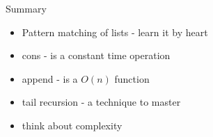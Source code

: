 \begin{frame}{Summary}

\begin{itemize}
 \pause\item Pattern matching of lists - learn it by heart
 \pause\item cons - is a constant time operation
 \pause\item append - is a $O(n)$ function
 \pause\item tail recursion - a technique to master 
 \pause\item think about complexity
\end{itemize}

\end{frame}






